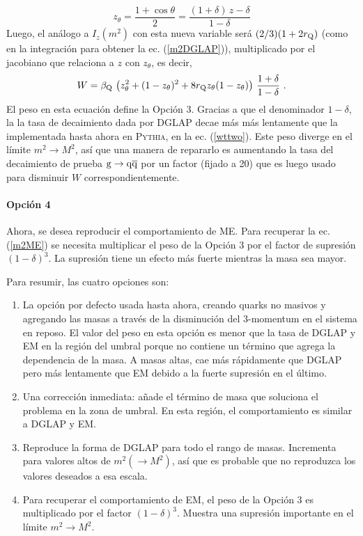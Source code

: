 \begin{equation}
z_{\theta} = \frac{1 + \cos\theta}{2} = 
\frac{ (1 + \delta) \, z - \delta}{1 - \delta}
\end{equation}Luego, el análogo a $I_z(m^2)$ con esta nueva variable será $(2/3)(1+2r_{\mathrm Q})$ (como en la integración para obtener la ec. (\ref{m2DGLAP})), multiplicado por el jacobiano que relaciona a $z$ con $z_\theta$, es decir,
\begin{equation}
W = \beta_{{\mathrm Q}} \, \left( z_{\theta}^2 + (1 - z_{\theta})^2 + 8 r_{{\mathrm Q}} z_{\theta} 
(1 - z_{\theta}) \right) \, \frac{1 + \delta}{1 - \delta} ~.
\label{wttwo}
\end{equation}
El peso en esta ecuación define la Opción 3. Gracias a que el denominador $1-\delta$, la la tasa de decaimiento dada por DGLAP decae más más lentamente que la implementada hasta ahora en \textsc{Pythia}, en la ec. (\ref{wttwo}). Este peso diverge en el límite $m^2\to M^2$, así que una manera de repararlo es aumentando la tasa del decaimiento de prueba ${\mathrm g}\to{\mathrm q}\overline{\mathrm q}$ por un factor (fijado a 20) que es luego usado para disminuir $W$ correspondientemente.

\paragraph{Opción 4}

Ahora, se desea reproducir el comportamiento de ME. Para recuperar la ec. (\ref{m2ME}) se necesita multiplicar el peso de la Opción 3 por el factor de supresión $(1-\delta)^3$. La supresión tiene un efecto más fuerte mientras la masa sea mayor.

Para resumir, las cuatro opciones son:

\begin{enumerate}
\item La opción por defecto usada hasta ahora, creando quarks no masivos y agregando las masas a través de la disminución del 3-momentum en el sistema en reposo. El valor del peso en esta opción es menor que la tasa de DGLAP y EM en la región del umbral porque no contiene un término que agrega la dependencia de la masa. A masas altas, cae más rápidamente que DGLAP pero más lentamente que EM debido a la fuerte supresión en el último.
\item Una corrección inmediata: añade el término de masa que soluciona el problema en la zona de umbral. En esta región, el comportamiento es similar a DGLAP y EM.
\item Reproduce la forma de DGLAP para todo el rango de masas. Incrementa para valores altos de $m^2(\to M^2)$, así que es probable que no reproduzca los valores deseados a esa escala.
\item Para recuperar el comportamiento de EM, el peso de la Opción 3 es multiplicado por el factor $(1-\delta)^3$. Muestra una supresión importante en el límite $m^2\to M^2$.
\end{enumerate}

